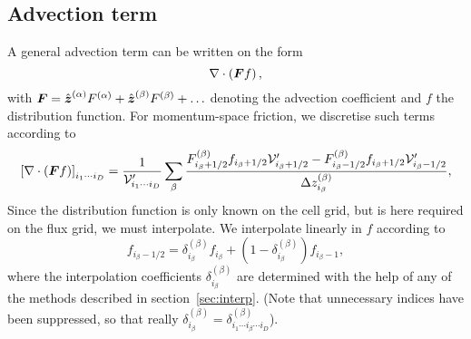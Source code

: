 \documentclass{notes}
\newcommand{\Vp}{\mathcal{V}'}
\begin{document}
    \subsection{Advection term}\label{sec:advection}
    A general advection term can be written on the form
    \begin{equation*}
        \nabla\cdot\left( \boldsymbol{F} f \right),
    \end{equation*}
    with $\boldsymbol{F} = \hat{\boldsymbol{z}}^{(\alpha)}F^{(\alpha)} + \hat{\boldsymbol{z}}^{(\beta)}F^{(\beta)}+\ldots$
    denoting the advection coefficient and $f$ the distribution function. For
    momentum-space friction, we discretise such terms according to
    \begin{equation}\label{eq:advection:discr}
        \left[\nabla\cdot\left( \bb{F}f \right) \right]_{i_1\cdots i_D} =
            \frac{1}{\Vp_{i_1\cdots i_D}}\sum_\beta \frac{
                F^{(\beta)}_{i_\beta+1/2}f_{i_\beta+1/2} \Vp_{i_\beta+1/2} -
                F^{(\beta)}_{i_\beta-1/2}f_{i_\beta+1/2} \Vp_{i_\beta-1/2}
            }{\Delta z^{(\beta)}_{i_\beta}},
    \end{equation}
    Since the distribution function is only known on the cell grid, but is here
    required on the flux grid, we must interpolate. We interpolate linearly in
    $f$ according to
    \begin{equation}
        f_{i_\beta-1/2} = \delta^{(\beta)}_{i_\beta} f_{i_\beta} + \left( 1 - \delta^{(\beta)}_{i_\beta} \right) f_{i_\beta-1},
    \end{equation}
    where the interpolation coefficients $\delta^{(\beta)}_{i_\beta}$ are
    determined with the help of any of the methods described in
    section~\ref{sec:interp}. (Note that unnecessary indices have been
    suppressed, so that really
    $\delta^{(\beta)}_{i_\beta} = \delta^{(\beta)}_{i_1\cdots i_\beta\cdots i_D}$).
\end{document}
